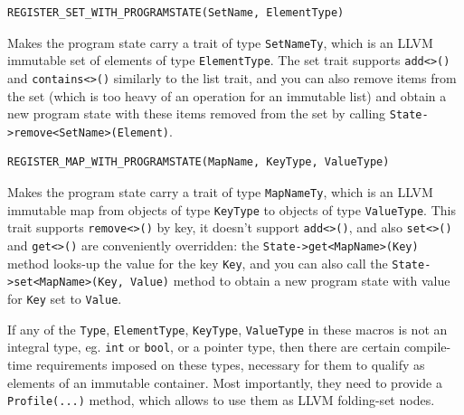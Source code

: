 \documentclass[a4paper,12pt]{article}
\newenvironment{nobr}{\begin{minipage}{\textwidth}\setlength\parskip{1em}
}{\end{minipage}\ignorespacesafterend}
\begin{document}
\begin{nobr}
\begin{lstlisting}[style=cplusplus,numbers=none]
REGISTER_SET_WITH_PROGRAMSTATE(SetName, ElementType)
\end{lstlisting}

Makes the program state carry a trait of type \lstinline|SetNameTy|, which is an LLVM immutable set of elements of type \lstinline|ElementType|. The set trait supports \lstinline|add<>()| and \lstinline|contains<>()| similarly to the list trait, and you can also remove items from the set (which is too heavy of an operation for an immutable list) and obtain a new program state with these items removed from the set by calling \lstinline|State->remove<SetName>(Element)|.
\end{nobr}

\begin{nobr}
\begin{lstlisting}[style=cplusplus,numbers=none]
REGISTER_MAP_WITH_PROGRAMSTATE(MapName, KeyType, ValueType)
\end{lstlisting}

Makes the program state carry a trait of type \lstinline|MapNameTy|, which is an LLVM immutable map from objects of type \lstinline|KeyType| to objects of type \lstinline|ValueType|. This trait supports \lstinline|remove<>()| by key, it doesn't support \lstinline|add<>()|, and also \lstinline|set<>()| and \lstinline|get<>()| are conveniently overridden: the \lstinline|State->get<MapName>(Key)| method looks-up the value for the key \lstinline|Key|, and you can also call the \lstinline|State->set<MapName>(Key, Value)| method to obtain a new program state with value for \lstinline|Key| set to \lstinline|Value|.
\end{nobr}

If any of the \lstinline|Type|, \lstinline|ElementType|, \lstinline|KeyType|, \lstinline|ValueType| in these macros is not an integral type, eg. \lstinline|int| or \lstinline|bool|, or a pointer type, then there are certain compile-time requirements imposed on these types, necessary for them to qualify as elements of an immutable container. Most importantly, they need to provide a \lstinline|Profile(...)| method, which allows to use them as LLVM folding-set nodes.
\end{document}
